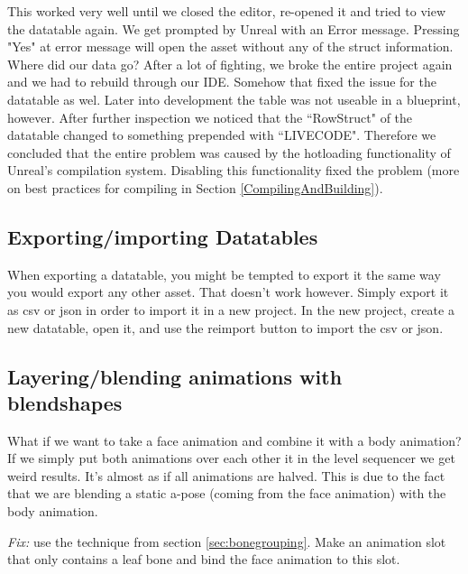 \documentclass{uva-inf-article}
\begin{document}
This worked very well until we closed the editor, re-opened it and tried to view the datatable again. We get prompted by Unreal with an Error message. Pressing "Yes" at error message will open the asset without any of the struct information. Where did our data go? After a lot of fighting, we broke the entire project again and we had to rebuild through our IDE. Somehow that fixed the issue for the datatable as wel. Later into development the table was not useable in a blueprint, however. After further inspection we noticed that the ``RowStruct" of the datatable changed to something prepended with ``LIVECODE". Therefore we concluded that the entire problem was caused by the hotloading functionality of Unreal's compilation system. Disabling this functionality fixed the problem (more on best practices for compiling in Section \ref{CompilingAndBuilding}).

\subsection{Exporting/importing Datatables}
When exporting a datatable, you might be tempted to export it the same way you would export any other asset. That doesn't work however. Simply export it as csv or json in order to import it in a new project. In the new project, create a new datatable, open it, and use the reimport button to import the csv or json.

\subsection{Layering/blending animations with blendshapes}
What if we want to take a face animation and combine it with a body animation? If we simply put both animations over each other it in the level sequencer we get weird results. It's almost as if all animations are halved. This is due to the fact that we are blending a static a-pose (coming from the face animation) with the body animation.

\textit{Fix:} use the technique from section \ref{sec:bonegrouping}. Make an animation slot that only contains a leaf bone and bind the face animation to this slot.


\printbibliography



\end{document}
